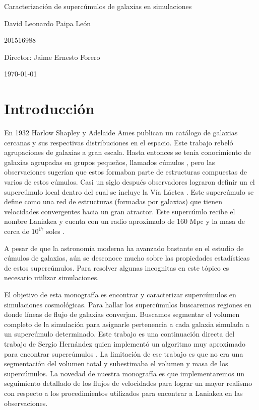 \documentclass[12pt]{article}
\begin{document}
\begin{center}
\Huge
Caracterización de supercúmulos de galaxias en simulaciones

\vspace{3mm}
\Large David Leonardo Paipa León


\large
201516988


\vspace{2mm}
\Large
Director: Jaime Ernesto Forero

\normalsize
\vspace{2mm}

\today
\end{center}


\normalsize
\section{Introducción}


En 1932 Harlow Shapley y Adelaide Ames publican un catálogo de
galaxias cercanas y sus respectivas distribuciones en el
espacio\cite{catalog}\cite{Shapley}.
Este trabajo rebel\'o agrupaciones de galaxias a gran escala. 
Hasta entonces se tenía conocimiento de galaxias agrupadas en grupos
pequeños, llamados cúmulos ,  pero las observaciones sugerían que estos formaban parte de estructuras
compuestas de varios de estos cúmulos. 
Casi un siglo despu\'es observadores lograron definir un 
el supercúmulo local dentro del cual se incluye la Vía Láctea \cite{tully}. 
Este supercúmulo se define como una red de estructuras (formadas por galaxias)
que tienen velocidades convergentes hacia un gran atractor.
Este superc\'umlo recibe el nombre Laniakea y cuenta con un radio
aproximado de 160 Mpc y la masa de cerca de $10^{17}$ soles
\cite{nature}.

A pesar de que la astronomía moderna ha avanzado bastante en el
estudio de cúmulos de galaxias, aún se desconoce mucho sobre las
propiedades estadísticas de estos supercúmulos. 
Para resolver
algunas incognitas en este tópico es necesario utilizar simulaciones.

El objetivo de esta monografía es encontrar y caracterizar supercúmulos en
simulaciones cosmol\'ogicas.
Para hallar los supercúmulos buscaremos regiones en donde l\'ineas de
flujo de galaxias converjan.
Buscamos segmentar el volumen completo de la simulaci\'on para
asignarle pertenencia a cada galaxia simulada a un superc\'umulo
determinado. 
Este trabajo es una continuaci\'on directa del trabajo de Sergio
Hern\'andez quien implement\'o un algoritmo muy aproximado para 
encontrar superc\'umulos \cite{Hernandez}. 
La limitaci\'on de ese trabajo es que no era una segmentaci\'on del
volumen total y subestimaba el volumen y masa de los superc\'umulos.
La novedad de nuestra monografía es que implementaremos un seguimiento
detallado de los flujos de velocidades para lograr un mayor realismo
con respecto a los procedimientos utilizados para encontrar a Laniakea
en las observaciones.
\end{document}
